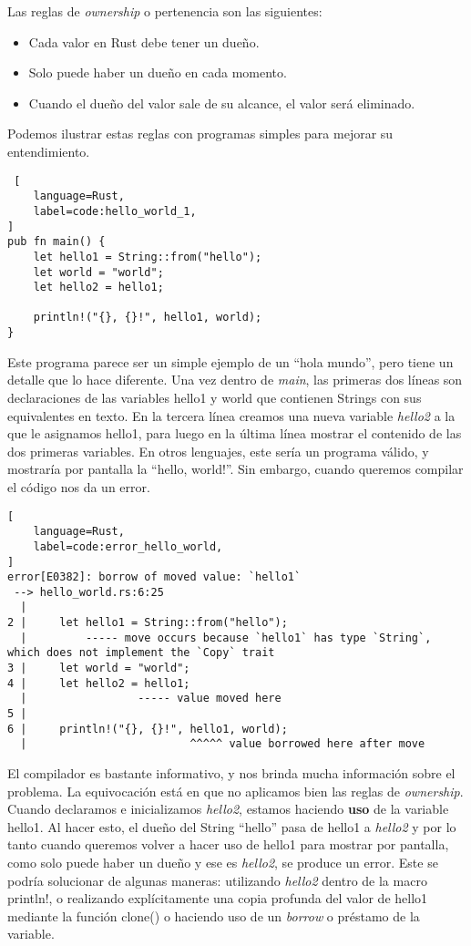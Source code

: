 Las reglas de \textit{ownership} o pertenencia son las siguientes:
\begin{itemize}[noitemsep, nolistsep]
    \item Cada valor en Rust debe tener un dueño.
    \item Solo puede haber un dueño en cada momento.
    \item Cuando el dueño del valor sale de su alcance, el valor será eliminado.
\end{itemize}

Podemos ilustrar estas reglas con programas simples para mejorar su entendimiento.
\begin{lstlisting} [
    language=Rust,
    label=code:hello_world_1,
]
pub fn main() {
    let hello1 = String::from("hello");
    let world = "world";
    let hello2 = hello1;

    println!("{}, {}!", hello1, world);
}
\end{lstlisting}

Este programa parece ser un simple ejemplo de un ``hola mundo'', pero tiene un detalle que lo hace diferente. Una vez dentro de \textit{main}, las primeras dos líneas son declaraciones de las variables hello1 y world que contienen Strings con sus equivalentes en texto. En la tercera línea creamos una nueva variable \textit{hello2} a la que le asignamos hello1, para luego en la última línea mostrar el contenido de las dos primeras variables. En otros lenguajes, este sería un programa válido, y mostraría por pantalla la ``hello, world!''. Sin embargo, cuando queremos compilar el código nos da un error.

\begin{lstlisting}[
    language=Rust,
    label=code:error_hello_world,
]
error[E0382]: borrow of moved value: `hello1`
 --> hello_world.rs:6:25
  |
2 |     let hello1 = String::from("hello");
  |         ----- move occurs because `hello1` has type `String`, which does not implement the `Copy` trait
3 |     let world = "world";
4 |     let hello2 = hello1;
  |                 ----- value moved here
5 |
6 |     println!("{}, {}!", hello1, world);
  |                         ^^^^^ value borrowed here after move
\end{lstlisting}

El compilador es bastante informativo, y nos brinda mucha información sobre el problema. La equivocación está en que no aplicamos bien las reglas de \textit{ownership}. Cuando declaramos e inicializamos \textit{hello2}, estamos haciendo \textbf{uso} de la variable hello1. Al hacer esto, el dueño del String ``hello'' pasa de hello1 a \textit{hello2} y por lo tanto cuando queremos volver a hacer uso de hello1 para mostrar por pantalla, como solo puede haber un dueño y ese es \textit{hello2}, se produce un error. Este se podría solucionar de algunas maneras: utilizando \textit{hello2} dentro de la macro println!, o realizando explícitamente una copia profunda del valor de hello1 mediante la función clone() o haciendo uso de un \textit{borrow} o préstamo de la variable.

